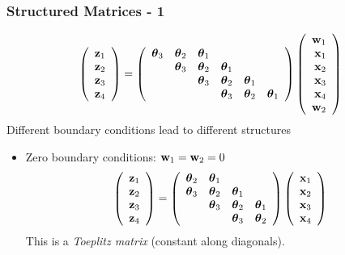 \documentclass[12pt,fleqn,handout]{beamer}
\begin{document}
\begin{frame}
	\frametitle{Structured Matrices - 1}
	$$
		\left( 
		\begin{array}{r}
			{\bf z}_1\\
			{\bf z}_2\\
			{\bf z}_3\\
			{\bf z}_4
		\end{array}
		\right)
		=
		\left( 
		\begin{array}{rrrrrrr}
			{\boldsymbol \theta}_3 & {\boldsymbol \theta}_2 & {\boldsymbol \theta}_1 &          &          &           \\
			         & {\boldsymbol \theta}_3 & {\boldsymbol \theta}_2 & {\boldsymbol \theta}_1 &          &           \\
			         &          & {\boldsymbol \theta}_3 & {\boldsymbol \theta}_2 & {\boldsymbol \theta}_1 &           \\
			         &          &          & {\boldsymbol \theta}_3 & {\boldsymbol \theta}_2 & {\boldsymbol \theta}_1 \\
		\end{array}
		\right)
		\left( 
		\begin{array}{r}
			{\bf w}_1\\
			{\bf x}_1\\
			{\bf x}_2\\
			{\bf x}_3\\
			{\bf x}_4\\
			{\bf w}_2
		\end{array}
		\right)
	$$
	Different boundary conditions lead to different structures
	\pause
	\begin{itemize}
		\item Zero boundary conditions: ${\bf w}_1 = {\bf w}_2 = 0$
	$$
		\left( 
		\begin{array}{r}
			{\bf z}_1\\
			{\bf z}_2\\
			{\bf z}_3\\
			{\bf z}_4
		\end{array}
		\right)
		=
		\left( 
		\begin{array}{rrrrr}
			{\boldsymbol \theta}_2 & {\boldsymbol \theta}_1 &          &           \\
			{\boldsymbol \theta}_3 & {\boldsymbol \theta}_2 & {\boldsymbol \theta}_1 &           \\
			         & {\boldsymbol \theta}_3 & {\boldsymbol \theta}_2 & {\boldsymbol \theta}_1  \\
			         &          & {\boldsymbol \theta}_3 & {\boldsymbol \theta}_2 \\
		\end{array}
		\right)
		\left( 
		\begin{array}{r}
			{\bf x}_1\\
			{\bf x}_2\\
			{\bf x}_3\\
			{\bf x}_4\\
		\end{array}
		\right)
	$$		
	This is a \emph{Toeplitz matrix} (constant along diagonals).
	\end{itemize}
\end{frame}
\end{document}
